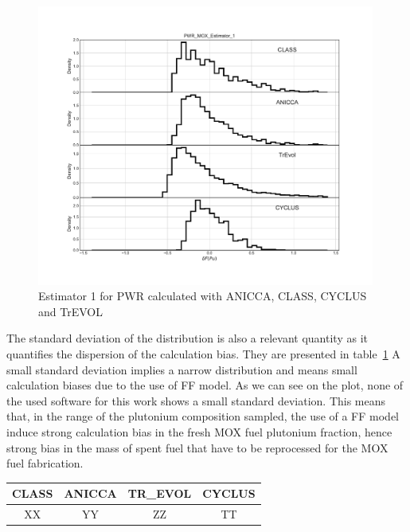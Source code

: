 \begin{figure}[h]
	\begin{center}
		\includegraphics[width = 0.99\textwidth]{../../Feature_1/RAW_DATA/FIG/PWR_MOX_Estimator_1.pdf}
		\caption{Estimator 1 for PWR calculated with ANICCA, CLASS, CYCLUS and TrEVOL}
		\label{fig:Est1_PWR}
	\end{center}
\end{figure}

The standard deviation of the distribution is also a relevant quantity as it quantifies the dispersion of the calculation bias. They are presented in table~\ref{table:Est1_PWR} A small standard deviation implies a narrow distribution and means small calculation biases due to the use of FF model. As we can see on the plot, none of the used software for this work shows a small standard deviation. This means that, in the range of the plutonium composition sampled, the use of a FF model induce strong calculation bias in the fresh MOX fuel plutonium fraction, hence strong bias in the mass of spent fuel that have to be reprocessed for the MOX fuel fabrication.

\begin{table}[h]
	\begin{center}
		\begin{tabular}{|c||c||c||c|}
			\hline 
				CLASS & ANICCA & TR\_EVOL & CYCLUS \\
			\hline
				XX & YY & ZZ & TT \\
		\end{tabular}
	\end{center}
	\label{table:Est1_PWR}
\end{table}

